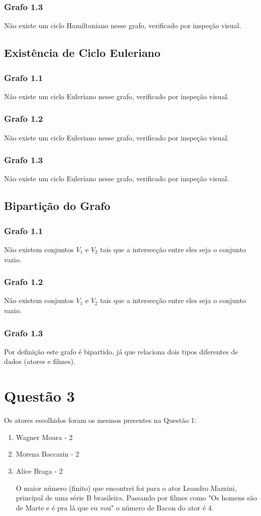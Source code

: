 \documentclass{article}
\begin{document}
\subsubsection{Grafo 1.3}
Não existe um ciclo Hamiltoniano nesse grafo, verificado por inspeção visual.
\subsection{Existência de Ciclo Euleriano}
\subsubsection{Grafo 1.1}
Não existe um ciclo Euleriano nesse grafo, verificado por inspeção visual.
\subsubsection{Grafo 1.2}
Não existe um ciclo Euleriano nesse grafo, verificado por inspeção visual.
\subsubsection{Grafo 1.3}
Não existe um ciclo Euleriano nesse grafo, verificado por inspeção visual.
\subsection{Bipartição do Grafo}
\subsubsection{Grafo 1.1}
Não existem conjuntos {$V_1$} e {$V_2$} tais que a intersecção entre eles seja o conjunto vazio.
\subsubsection{Grafo 1.2}
Não existem conjuntos {$V_1$} e {$V_2$} tais que a intersecção entre eles seja o conjunto vazio.
\subsubsection{Grafo 1.3}
Por definição este grafo é bipartido, já que relaciona dois tipos diferentes de dados (atores e filmes).
\newpage
\section{Questão 3}
Os atores escolhidos foram os mesmos presentes na Questão 1:
\begin{enumerate}
    \item Wagner Moura - 2
    \item Morena Baccarin - 2
    \item Alice Braga - 2

O maior número (finito) que encontrei foi para o ator Leandro Mazzini, principal de uma série B brasileira. Passando por filmes como "Os homens são de Marte e é pra lá que eu vou" o número de Bacon do ator é 4.
\end{enumerate}
\end{document}
